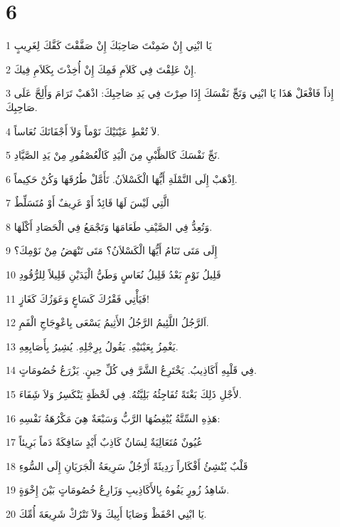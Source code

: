 \chapter{6}

\par 1 يَا ابْنِي إِنْ ضَمِنْتَ صَاحِبَكَ إِنْ صَفَّقْتَ كَفَّكَ لِغَرِيبٍ
\par 2 إِنْ عَلِقْتَ فِي كَلاَمِ فَمِكَ إِنْ أُخِذْتَ بِكَلاَمِ فِيكَ.
\par 3 إِذاً فَافْعَلْ هَذَا يَا ابْنِي وَنَجِّ نَفْسَكَ إِذَا صِرْتَ فِي يَدِ صَاحِبِكَ: اذْهَبْ تَرَامَ وَأَلِحَّ عَلَى صَاحِبِكَ.
\par 4 لاَ تُعْطِ عَيْنَيْكَ نَوْماً وَلاَ أَجْفَانَكَ نُعَاساً.
\par 5 نَجِّ نَفْسَكَ كَالظَّبْيِ مِنَ الْيَدِ كَالْعُصْفُورِ مِنْ يَدِ الصَّيَّادِ.
\par 6 اِذْهَبْ إِلَى النَّمْلَةِ أَيُّهَا الْكَسْلاَنُ. تَأَمَّلْ طُرُقَهَا وَكُنْ حَكِيماً.
\par 7 الَّتِي لَيْسَ لَهَا قَائِدٌ أَوْ عَرِيفٌ أَوْ مُتَسَلِّطٌ
\par 8 وَتُعِدُّ فِي الصَّيْفِ طَعَامَهَا وَتَجْمَعُ فِي الْحَصَادِ أَكْلَهَا.
\par 9 إِلَى مَتَى تَنَامُ أَيُّهَا الْكَسْلاَنُ؟ مَتَى تَنْهَضُ مِنْ نَوْمِكَ؟
\par 10 قَلِيلُ نَوْمٍ بَعْدُ قَلِيلُ نُعَاسٍ وَطَيُّ الْيَدَيْنِ قَلِيلاً لِلرُّقُودِ
\par 11 فَيَأْتِي فَقْرُكَ كَسَاعٍ وَعَوَزُكَ كَغَازٍ!
\par 12 اَلرَّجُلُ اللَّئِيمُ الرَّجُلُ الأَثِيمُ يَسْعَى بِاعْوِجَاجِ الْفَمِ.
\par 13 يَغْمِزُ بِعَيْنَيْهِ. يَقُولُ بِرِجْلِهِ. يُشِيرُ بِأَصَابِعِهِ.
\par 14 فِي قَلْبِهِ أَكَاذِيبُ. يَخْتَرِعُ الشَّرَّ فِي كُلِّ حِينٍ. يَزْرَعُ خُصُومَاتٍ.
\par 15 لأَجْلِ ذَلِكَ بَغْتَةً تُفَاجِئُهُ بَلِيَّتُهُ. فِي لَحْظَةٍ يَنْكَسِرُ وَلاَ شَِفَاءَ.
\par 16 هَذِهِ السِّتَّةُ يُبْغِضُهَا الرَّبُّ وَسَبْعَةٌ هِيَ مَكْرُهَةُ نَفْسِهِ:
\par 17 عُيُونٌ مُتَعَالِيَةٌ لِسَانٌ كَاذِبٌ أَيْدٍ سَافِكَةٌ دَماً بَرِيئاً
\par 18 قَلْبٌ يُنْشِئُ أَفْكَاراً رَدِيئَةً أَرْجُلٌ سَرِيعَةُ الْجَرَيَانِ إِلَى السُّوءِ
\par 19 شَاهِدُ زُورٍ يَفُوهُ بِالأَكَاذِيبِ وَزَارِعُ خُصُومَاتٍ بَيْنَ إِخْوَةٍ.
\par 20 يَا ابْنِي احْفَظْ وَصَايَا أَبِيكَ وَلاَ تَتْرُكْ شَرِيعَةَ أُمِّكَ.
